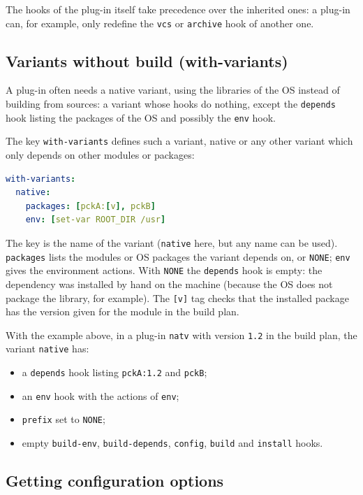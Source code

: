 \documentclass[a4paper,12pt,twoside]{article}
\newcommand{\code}[1]{\texttt{#1}}
\begin{document}
The hooks of the plug-in itself take precedence over the inherited ones:
a plug-in can, for example, only redefine the \code{vcs} or \code{archive}
hook of another one.

\subsection{Variants without build (with-variants)}
\label{native variant}

A plug-in often needs a native variant, using the libraries of the OS instead of building from sources: a variant whose hooks do nothing, except the \code{depends} hook listing the packages of the OS and possibly the \code{env} hook.

The key \code{with-variants} defines such a variant, native or any other
variant which only depends on other modules or packages:

\begin{lstlisting}[language={yaml}]
with-variants:
  native:
    packages: [pckA:[v], pckB]
    env: [set-var ROOT_DIR /usr]
\end{lstlisting}

The key is the name of the variant (\code{native} here, but any name can be
used). \code{packages} lists the modules or OS packages the variant
depends on, or \code{NONE}; \code{env} gives the environment actions. With \code{NONE} the \code{depends} hook is empty: the dependency was installed by hand on the machine (because the OS does not package the library, for example). The \code{[v]} tag checks that the installed package has the version given for the module in the build plan.

With the example above, in a plug-in \code{natv} with version \code{1.2} in the build plan, the variant \code{native} has:

\begin{itemize}
	\item a \code{depends} hook listing \code{pckA:1.2} and \code{pckB};
	\item an \code{env} hook with the actions of \code{env};
	\item \code{prefix} set to \code{NONE};
	\item empty \code{build-env}, \code{build-depends}, \code{config}, \code{build} and \code{install} hooks.
\end{itemize}

\subsection{Getting configuration options}
\label{config-options}
\label{get config options}
\end{document}
